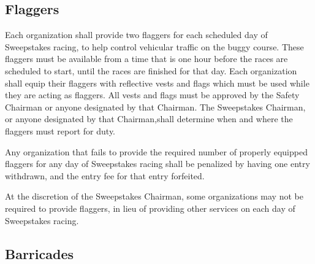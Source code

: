 \documentclass[openany]{book}
\begin{document}
\subsection{Flaggers}

Each organization shall provide two flaggers for each scheduled day of Sweepstakes racing, to help control vehicular traffic on the buggy course. These flaggers must be available from a time that is one hour before the races are scheduled to start, until the races are finished for that day. Each organization shall equip their flaggers with reflective vests and flags which must be used while they are acting as flaggers. All vests and flags must be approved by the Safety Chairman or anyone designated by that Chairman. The Sweepstakes Chairman, or anyone designated by that Chairman,shall determine when and where the flaggers must report for duty.

Any organization that fails to provide the required number of properly equipped flaggers for any day of Sweepstakes racing shall be penalized by having one entry withdrawn, and the entry fee for that entry forfeited.

At the discretion of the Sweepstakes Chairman, some organizations may not be required to provide flaggers, in lieu of providing other services on each day of Sweepstakes racing.

\subsection{Barricades}
\end{document}
